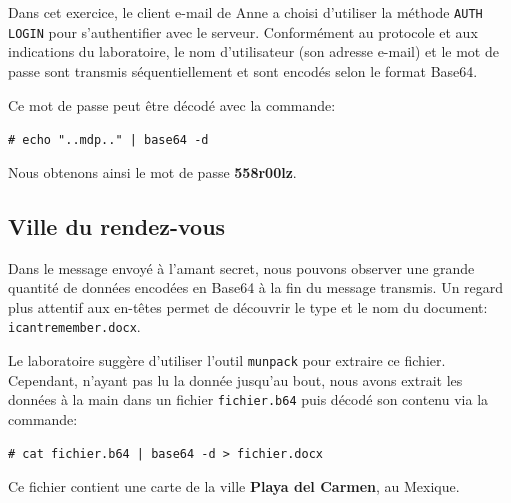 \documentclass[11pt,a4paper]{article}
\newcommand{\shellcmd}[1]{\texttt{\footnotesize\# #1}}
\begin{document}
Dans cet exercice, le client e-mail de Anne a choisi d'utiliser la méthode \texttt{AUTH LOGIN} pour s'authentifier avec le serveur. Conformément au protocole et aux indications du laboratoire, le nom d'utilisateur (son adresse e-mail) et le mot de passe sont transmis séquentiellement et sont encodés selon le format Base64.

Ce mot de passe peut être décodé avec la commande:

\shellcmd{echo "..mdp.." | base64 -d}

Nous obtenons ainsi le mot de passe \textbf{558r00lz}.

\subsection{Ville du rendez-vous}

Dans le message envoyé à l'amant secret, nous pouvons observer une grande quantité de données encodées en Base64 à la fin du message transmis. Un regard plus attentif aux en-têtes permet de découvrir le type et le nom du document: \texttt{icantremember.docx}.

Le laboratoire suggère d'utiliser l'outil \texttt{munpack} pour extraire ce fichier. Cependant, n'ayant pas lu la donnée jusqu'au bout, nous avons extrait les données à la main dans un fichier \texttt{fichier.b64} puis décodé son contenu via la commande:

\shellcmd{cat fichier.b64 | base64 -d > fichier.docx}

Ce fichier contient une carte de la ville \textbf{Playa del Carmen}, au Mexique.
\end{document}
